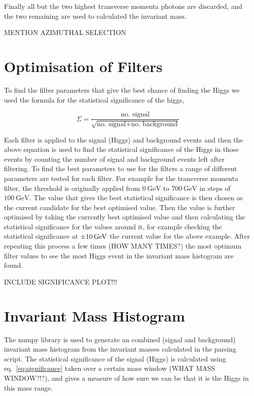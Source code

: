 \documentclass[11pt]{amsart}
\begin{document}
\begin{multicols}{2}
Finally all but the two highest transverse momenta photons are discarded, and the two remaining are used to calculated the invariant mass.

MENTION AZIMUTHAL SELECTION


\section{Optimisation of Filters}

To find the filter parameters that give the best chance of finding the Higgs we used the formula for the statistical significance of the higgs,

\begin{equation}
  \label{eq:significance}
  \Sigma = \frac{\text{no. signal}}{\sqrt{\text{no. signal} + \text{no. background}}}
\end{equation}

Each filter is applied to the signal (Higgs) and background events and then the above equation is used to find the statistical significance of the Higgs in those events by counting the number of signal and background events left after filtering. To find the best parameters to use for the filters a range of different parameters are tested for each filter. For example for the transverse momenta filter, the threshold is originally applied from $\SI{0}{\giga\electronvolt}$ to $\SI{700}{\giga\electronvolt}$ in steps of $\SI{100}{\giga\electronvolt}$. The value that gives the best statistical significance is then chosen as the current candidate for the best optimised value. Then the value is further optimised by taking the currently best optimised value and then calculating the statistical significance for the values around it, for example checking the statistical significance at $\SI{\pm10}{\giga\electronvolt}$ the current value for the above example. After repeating this process a few times (HOW MANY TIMES?) the most optimum filter values to see the most Higgs event in the invariant mass histogram are found.

INCLUDE SIGNIFICANCE PLOT!!!


\section{Invariant Mass Histogram}

The numpy library is used to generate an combined (signal and background) invariant mass histogram from the invariant masses calculated in the parsing script. The statistical significance of the signal (Higgs) is calculated using eq.~\ref{eq:significance} taken over a certain mass window (WHAT MASS WINDOW?!?), and gives a measure of how sure we can be that it is the Higgs in this mass range.


\end{multicols}
\end{document}
